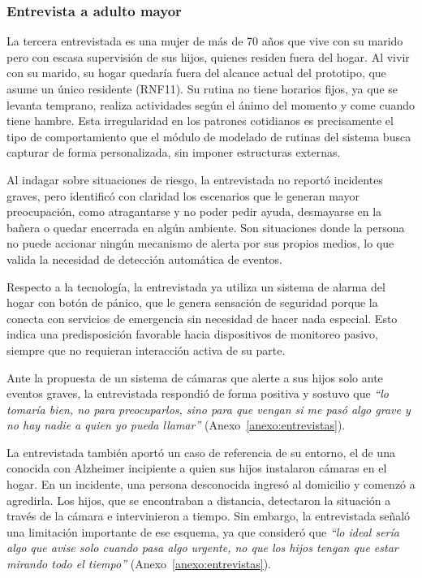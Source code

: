 \subsubsection{Entrevista a adulto mayor}

La tercera entrevistada es una mujer de más de 70 años que vive con su marido pero con escasa supervisión de sus hijos, quienes residen fuera del hogar.
Al vivir con su marido, su hogar quedaría fuera del alcance actual del prototipo, que asume un único residente (RNF11).
Su rutina no tiene horarios fijos, ya que se levanta temprano, realiza actividades según el ánimo del momento y come cuando tiene hambre.
Esta irregularidad en los patrones cotidianos es precisamente el tipo de comportamiento que el módulo de modelado de rutinas del sistema busca capturar de forma personalizada, sin imponer estructuras externas.

Al indagar sobre situaciones de riesgo, la entrevistada no reportó incidentes graves, pero identificó con claridad los escenarios que le generan mayor preocupación, como atragantarse y no poder pedir ayuda, desmayarse en la bañera o quedar encerrada en algún ambiente.
Son situaciones donde la persona no puede accionar ningún mecanismo de alerta por sus propios medios, lo que valida la necesidad de detección automática de eventos.

Respecto a la tecnología, la entrevistada ya utiliza un sistema de alarma del hogar con botón de pánico, que le genera sensación de seguridad porque la conecta con servicios de emergencia sin necesidad de hacer nada especial.
Esto indica una predisposición favorable hacia dispositivos de monitoreo pasivo, siempre que no requieran interacción activa de su parte.

Ante la propuesta de un sistema de cámaras que alerte a sus hijos solo ante eventos graves, la entrevistada respondió de forma positiva y sostuvo que \textit{``lo tomaría bien, no para preocuparlos, sino para que vengan si me pasó algo grave y no hay nadie a quien yo pueda llamar''} (Anexo~\ref{anexo:entrevistas}).

La entrevistada también aportó un caso de referencia de su entorno, el de una conocida con Alzheimer incipiente a quien sus hijos instalaron cámaras en el hogar.
En un incidente, una persona desconocida ingresó al domicilio y comenzó a agredirla.
Los hijos, que se encontraban a distancia, detectaron la situación a través de la cámara e intervinieron a tiempo.
Sin embargo, la entrevistada señaló una limitación importante de ese esquema, ya que consideró que \textit{``lo ideal sería algo que avise solo cuando pasa algo urgente, no que los hijos tengan que estar mirando todo el tiempo''} (Anexo~\ref{anexo:entrevistas}).

